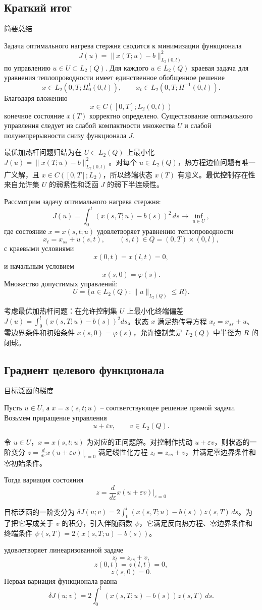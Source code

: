 \documentclass[12pt,a4paper]{article}
\newcommand{\zh}[1]{\par\noindent #1\par}
\begin{document}
\subsection*{Краткий итог}
\zh{简要总结}
Задача оптимального нагрева стержня сводится к минимизации функционала
\[
J(u)=\|x(T;u)-b\|_{L_2(0,l)}^2
\]
по управлению \(u\in U\subset L_2(Q)\). Для каждого \(u\in L_2(Q)\) краевая задача для уравнения теплопроводности имеет единственное обобщенное решение
\[
x\in L_2(0,T;H_0^1(0,l)),
\qquad
x_t\in L_2(0,T;H^{-1}(0,l)).
\]
Благодаря вложению
\[
x\in C([0,T];L_2(0,l))
\]
конечное состояние \(x(T)\) корректно определено. Существование оптимального управления следует из слабой компактности множества \(U\) и слабой полунепрерывности снизу функционала \(J\).
\zh{最优加热杆问题归结为在 \(U\subset L_2(Q)\) 上最小化 \(J(u)=\|x(T;u)-b\|_{L_2(0,l)}^2\)。对每个 \(u\in L_2(Q)\)，热方程边值问题有唯一广义解，且 \(x\in C([0,T];L_2)\)，所以终端状态 \(x(T)\) 有意义。最优控制存在性来自允许集 \(U\) 的弱紧性和泛函 \(J\) 的弱下半连续性。}

\newpage


Рассмотрим задачу оптимального нагрева стержня:
\[
J(u)=\int_0^l (x(s,T;u)-b(s))^2\,ds\to\inf_{u\in U},
\]
где состояние \(x=x(s,t;u)\) удовлетворяет уравнению теплопроводности
\[
x_t=x_{ss}+u(s,t),
\qquad (s,t)\in Q=(0,T)\times(0,l),
\]
с краевыми условиями
\[
x(0,t)=x(l,t)=0,
\]
и начальным условием
\[
x(s,0)=\varphi(s).
\]
Множество допустимых управлений:
\[
U=\{u\in L_2(Q):\|u\|_{L_2(Q)}\le R\}.
\]
\zh{考虑最优加热杆问题：在允许控制集 \(U\) 上最小化终端偏差 \(J(u)=\int_0^l(x(s,T;u)-b(s))^2ds\)。状态 \(x\) 满足热传导方程 \(x_t=x_{ss}+u\)、零边界条件和初始条件 \(x(s,0)=\varphi(s)\)，允许控制集是 \(L_2(Q)\) 中半径为 \(R\) 的闭球。}

\subsection*{Градиент целевого функционала}
\zh{目标泛函的梯度}
Пусть \(u\in U\), а \(x=x(s,t;u)\) -- соответствующее решение прямой задачи. Возьмем приращение управления
\[
u+\varepsilon v,
\qquad v\in L_2(Q).
\]
\zh{令 \(u\in U\)，\(x=x(s,t;u)\) 为对应的正问题解。对控制作扰动 \(u+\varepsilon v\)，则状态的一阶变分 \(z=\frac{d}{d\varepsilon}x(u+\varepsilon v)|_{\varepsilon=0}\) 满足线性化方程 \(z_t=z_{ss}+v\)，并满足零边界条件和零初始条件。}
Тогда вариация состояния
\[
z=\frac{d}{d\varepsilon}x(u+\varepsilon v)\bigg|_{\varepsilon=0}
\]
\zh{目标泛函的一阶变分为 \(\delta J(u;v)=2\int_0^l(x(s,T;u)-b(s))z(s,T)\,ds\)。为了把它写成关于 \(v\) 的积分，引入伴随函数 \(\psi\)，它满足反向热方程、零边界条件和终端条件 \(\psi(s,T)=2(x(s,T;u)-b(s))\)。}
удовлетворяет линеаризованной задаче
\[
z_t=z_{ss}+v,
\]
\[
z(0,t)=z(l,t)=0,
\]
\[
z(s,0)=0.
\]
Первая вариация функционала равна
\[
\delta J(u;v)=
2\int_0^l (x(s,T;u)-b(s))z(s,T)\,ds.
\]
\end{document}
